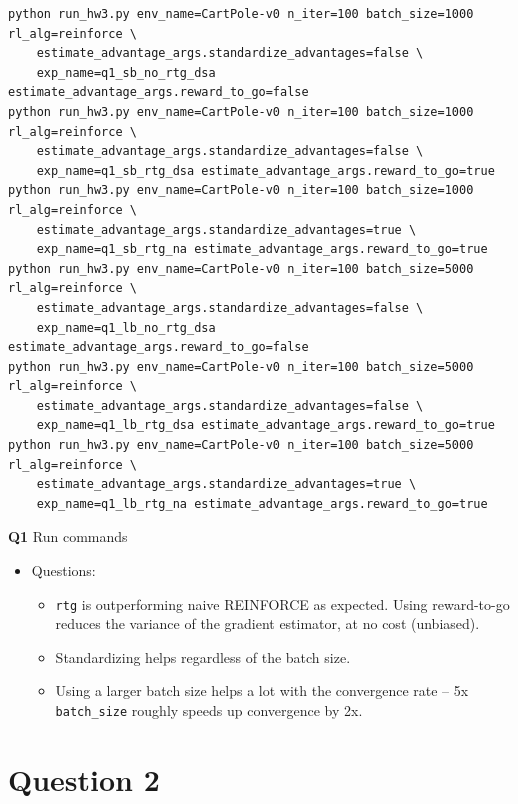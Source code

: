 \documentclass[11pt]{article}
\begin{document}
\begin{listing}[htbp]
\begin{verbatim}
python run_hw3.py env_name=CartPole-v0 n_iter=100 batch_size=1000 rl_alg=reinforce \
    estimate_advantage_args.standardize_advantages=false \
    exp_name=q1_sb_no_rtg_dsa estimate_advantage_args.reward_to_go=false
python run_hw3.py env_name=CartPole-v0 n_iter=100 batch_size=1000 rl_alg=reinforce \
    estimate_advantage_args.standardize_advantages=false \
    exp_name=q1_sb_rtg_dsa estimate_advantage_args.reward_to_go=true
python run_hw3.py env_name=CartPole-v0 n_iter=100 batch_size=1000 rl_alg=reinforce \
    estimate_advantage_args.standardize_advantages=true \
    exp_name=q1_sb_rtg_na estimate_advantage_args.reward_to_go=true
python run_hw3.py env_name=CartPole-v0 n_iter=100 batch_size=5000 rl_alg=reinforce \
    estimate_advantage_args.standardize_advantages=false \
    exp_name=q1_lb_no_rtg_dsa estimate_advantage_args.reward_to_go=false
python run_hw3.py env_name=CartPole-v0 n_iter=100 batch_size=5000 rl_alg=reinforce \
    estimate_advantage_args.standardize_advantages=false \
    exp_name=q1_lb_rtg_dsa estimate_advantage_args.reward_to_go=true
python run_hw3.py env_name=CartPole-v0 n_iter=100 batch_size=5000 rl_alg=reinforce \
    estimate_advantage_args.standardize_advantages=true \
    exp_name=q1_lb_rtg_na estimate_advantage_args.reward_to_go=true
\end{verbatim}
\caption{\textbf{Q1} Run commands}
\end{listing}

\begin{itemize}
\item Questions:
\begin{itemize}
\item \texttt{rtg} is outperforming naive REINFORCE as expected. Using reward-to-go reduces the variance of the gradient estimator, at no cost (unbiased).
\item Standardizing helps regardless of the batch size.
\item Using a larger batch size helps a lot with the convergence rate -- 5x \texttt{batch\_size} roughly speeds up convergence by 2x.
\end{itemize}
\end{itemize}


\clearpage

\section{Question 2}
\label{sec:orgff4af76}
\end{document}
